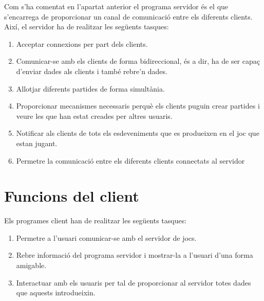 Com s'ha comentat en l'apartat anterior el programa servidor és el que s'encarrega de proporcionar un canal de comunicació entre els diferents clients. Així, el servidor ha de realitzar les següents tasques:

\begin{enumerate}
	\item{Acceptar connexions per part dels clients.}
	\item{Comunicar-se amb els clients de forma bidireccional, és a dir, ha de ser capaç d'enviar dades als clients  i també rebre'n dades.}
	\item{Allotjar diferents partides de forma simultània.}
	\item{Proporcionar mecanismes necessaris perquè els clients puguin crear partides i veure les que han estat creades per altres usuaris.}
	\item{Notificar als clients de tots els esdeveniments que es produeixen en el joc que estan jugant.}
	\item{Permetre la comunicació entre els diferents clients connectats al servidor}	
\end{enumerate}

\section{Funcions del client}

Els programes client han de realitzar les següents tasques: 

\begin{enumerate}
	\item{Permetre a l'usuari comunicar-se amb el servidor de jocs.}
	\item{Rebre informació del programa servidor i mostrar-la a l'usuari d'una forma amigable.}
	\item{Interactuar amb els usuaris per tal de proporcionar al servidor totes dades que aquests introdueixin.}	
\end{enumerate}



